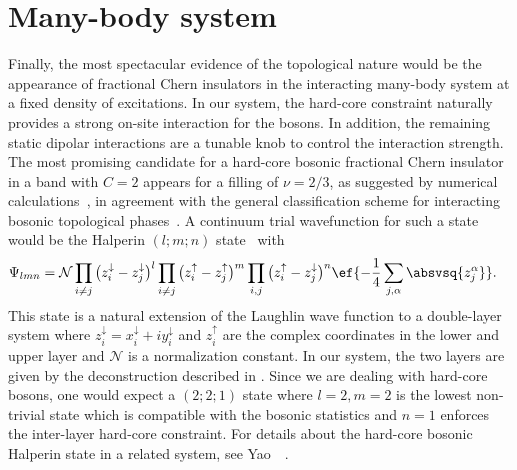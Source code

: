 \section{Many-body system}
Finally, the most spectacular evidence of the topological nature would be the appearance of fractional Chern insulators in the interacting many-body system at a fixed density of excitations.
In our system, the hard-core constraint naturally provides a strong on-site interaction for the bosons.
In addition, the remaining static dipolar interactions are a tunable knob to control the interaction strength.
The most promising candidate for a hard-core bosonic fractional Chern insulator in a band with $C=2$ appears for a filling of $\nu = 2/3$, as suggested by numerical calculations~\cite{Moller2009,Wang2012a,Yao2015}, in agreement with the general classification scheme for interacting bosonic topological phases~\cite{Lu2012a,Chen2013}.
A continuum trial wavefunction for such a state would be the Halperin $(l;m;n)$ state~\cite{Halperin1984,Wu2013,Yao2013,Wang2012a,Wang2011,Yao2015} with
\begin{align}
    \Psi_{lmn} &= \mathcal{N}
    \prod_{i\ne j} \big(z_i^\downarrow - z_j^\downarrow\big)^l
    \prod_{i\ne j} \big(z_i^\uparrow -   z_j^\uparrow  \big)^m
    \prod_{i, j} \big(z_i^\uparrow -   z_j^\downarrow\big)^n
    \ef{-\frac{1}{4}\sum_{j,\alpha} \absvsq{z^\alpha_j} }.
\end{align}
This state is a natural extension of the Laughlin wave function to a double-layer system where $z_i^\downarrow=x_i^\downarrow+i y_i^\downarrow$ and $z_i^\uparrow$ are the complex coordinates in the lower and upper layer and $\mathcal{N}$ is a normalization constant.
In our system, the two layers are given by the deconstruction described in .
Since we are dealing with hard-core bosons, one would expect a $(2;2;1)$ state where $l=2, m=2$ is the lowest non-trivial state which is compatible with the bosonic statistics and $n=1$ enforces the inter-layer hard-core constraint.
For details about the hard-core bosonic Halperin state in a related system, see Yao~\etal~\cite{Yao2015}.
